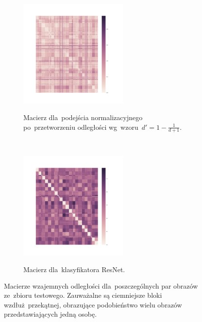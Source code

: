 \documentclass[11pt,a4paper]{article}
\begin{document}
\begin{figure}[H]
    \begin{subfigure}{\textwidth}
        \centering
        \includegraphics[width=0.6\textwidth]{res/img/normalized_distance_matrix.png}
        \label{subfig:normalized-distance-matrix}
        \caption{Macierz dla~podejścia normalizacyjnego po~przetworzeniu odległości wg~wzoru~$d' = 1 - \frac{1}{d + 1}$.}
    \end{subfigure}
    \\
    \begin{subfigure}{\textwidth}
        \centering
        \includegraphics[width=0.6\textwidth]{res/img/resnet_distance_matrix.png}
        \label{subfig:resnet-distance-matrix}
        \caption{Macierz dla~klasyfikatora ResNet.}
    \end{subfigure}
    \caption{Macierze wzajemnych odległości dla~poszczególnych par obrazów ze~zbioru testowego.
    Zauważalne są ciemniejsze bloki wzdłuż~przekątnej, obrazujące podobieństwo wielu obrazów przedstawiających jedną osobę.}
    \label{fig:distance-matrix}
\end{figure}
\end{document}
